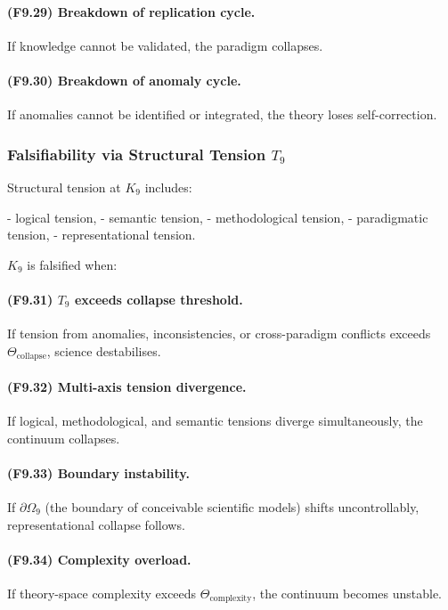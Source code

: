 \paragraph{(F9.29) Breakdown of replication cycle.}
If knowledge cannot be validated,
the paradigm collapses.

\paragraph{(F9.30) Breakdown of anomaly cycle.}
If anomalies cannot be identified or integrated,
the theory loses self-correction.



\subsubsection{Falsifiability via Structural Tension \texorpdfstring{$T_9$}{T_9}}

Structural tension at $K_9$ includes:

- logical tension,
- semantic tension,
- methodological tension,
- paradigmatic tension,
- representational tension.

$K_9$ is falsified when:

\paragraph{(F9.31) \texorpdfstring{$T_9$}{T_9} exceeds collapse threshold.}
If tension from anomalies, inconsistencies, or cross-paradigm conflicts
exceeds $\Theta_{\mathrm{collapse}}$, 
science destabilises.

\paragraph{(F9.32) Multi-axis tension divergence.}
If logical, methodological, and semantic tensions diverge simultaneously,
the continuum collapses.

\paragraph{(F9.33) Boundary instability.}
If $\partial\Omega_9$ (the boundary of conceivable scientific models)
shifts uncontrollably, representational collapse follows.

\paragraph{(F9.34) Complexity overload.}
If theory-space complexity exceeds
$\Theta_{\mathrm{complexity}}$,
the continuum becomes unstable.

